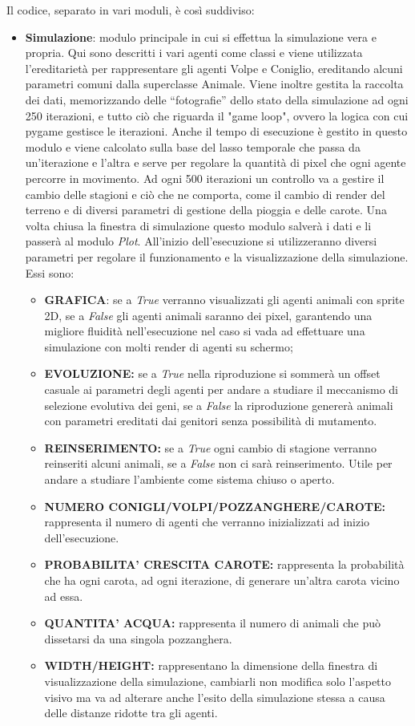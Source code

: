 \documentclass[11pt]{article}
\begin{document}
Il codice, separato in vari moduli, è così suddiviso: \begin{itemize}
    \item \textbf{Simulazione}: modulo principale in cui si effettua la simulazione vera e propria. Qui sono descritti i vari agenti come classi e viene utilizzata l'ereditarietà per rappresentare gli agenti Volpe e Coniglio, ereditando alcuni parametri comuni dalla superclasse Animale. Viene inoltre gestita la raccolta dei dati, memorizzando delle “fotografie” dello stato della simulazione ad ogni 250 iterazioni, e tutto ciò che riguarda il "game loop", ovvero la logica con cui pygame gestisce le iterazioni. Anche il tempo di esecuzione è gestito in questo modulo e viene calcolato sulla base del lasso temporale che passa da un'iterazione e l'altra e serve per regolare la quantità di pixel che ogni agente percorre in movimento. Ad ogni 500 iterazioni un controllo va a gestire il cambio delle stagioni e ciò che ne comporta, come il cambio di render del terreno e di diversi parametri di gestione della pioggia e delle carote. Una volta chiusa la finestra di simulazione questo modulo salverà i dati e li passerà al modulo \textit{Plot}. All'inizio dell'esecuzione si utilizzeranno diversi parametri per regolare il funzionamento e la visualizzazione della simulazione. Essi sono:
    \begin{itemize}
        \item \textbf{GRAFICA}: se a \textit{True} verranno visualizzati gli agenti animali con sprite 2D, se a \textit{False} gli agenti animali saranno dei pixel, garantendo una migliore fluidità nell'esecuzione nel caso si vada ad effettuare una simulazione con molti render di agenti su schermo;
        \item \textbf{EVOLUZIONE:} se a \textit{True} nella riproduzione si sommerà un offset casuale ai parametri degli agenti per andare a studiare il meccanismo di selezione evolutiva dei geni, se a \textit{False} la riproduzione genererà animali con parametri ereditati dai genitori senza possibilità di mutamento.
        \item \textbf{REINSERIMENTO:} se a \textit{True} ogni cambio di stagione verranno reinseriti alcuni animali, se a \textit{False} non ci sarà reinserimento. Utile per andare a studiare l'ambiente come sistema chiuso o aperto.
        \item \textbf{NUMERO CONIGLI/VOLPI/POZZANGHERE/CAROTE:}  rappresenta il numero di agenti che verranno inizializzati ad inizio dell’esecuzione.
        \item \textbf{PROBABILITA' CRESCITA CAROTE:}  rappresenta la probabilità che ha ogni carota, ad ogni iterazione, di generare un’altra carota vicino ad essa. 
        \item \textbf{QUANTITA' ACQUA:}  rappresenta il numero di animali che può dissetarsi da una singola pozzanghera.
        \item \textbf{WIDTH/HEIGHT:}  rappresentano la dimensione della finestra di visualizzazione della simulazione, cambiarli non modifica solo l’aspetto visivo ma va ad alterare anche l’esito della simulazione stessa a causa delle distanze ridotte tra gli agenti.


\end{itemize}
\end{itemize}
\end{document}
